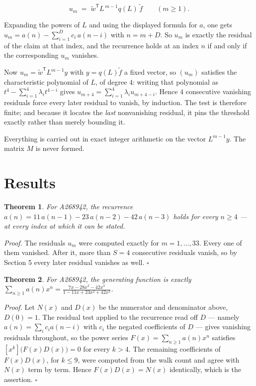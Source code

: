 \documentclass[11pt]{article}
\newtheorem{theorem}{Theorem}
\theoremstyle{definition}
\begin{document}
\[u_m \;=\; \tilde w^{\mathsf T} L^{\,m-1} q(L)\,\tilde f \qquad (m \ge 1).\]

Expanding the powers of $L$ and using the displayed formula for $a$, one gets $u_m = a(n) - \sum_{i=1}^{D} c_i\,a(n-i)$ with $n = m + D$. So $u_m$ is exactly the residual of the claim at that index, and the recurrence holds at an index $n$ if and only if the corresponding $u_m$ vanishes.

Now $u_m = \tilde w^{\mathsf T} L^{m-1} y$ with $y = q(L)\tilde f$ a fixed vector, so $(u_m)$ satisfies the characteristic polynomial of $L$, of degree $4$: writing that polynomial as $t^{4} - \sum_{i=1}^{4} \lambda_i t^{4-i}$ gives $u_{m+4} = \sum_{i=1}^{4} \lambda_i u_{m+4-i}$. Hence $4$ consecutive vanishing residuals force every later residual to vanish, by induction. The test is therefore finite; and because it locates the {\itshape last} nonvanishing residual, it pins the threshold exactly rather than merely bounding it.

Everything is carried out in exact integer arithmetic on the vector $L^{m-1}y$. The matrix $M$ is never formed.

\section{Results}

\begin{theorem} For A268942, the recurrence $a(n) = 11\,a(n-1) - 23\,a(n-2) - 42\,a(n-3)$ holds for every $n \ge 4$ --- at every index at which it can be stated.\end{theorem}

{\itshape Proof.} The residuals $u_m$ were computed exactly for $m = 1,\dots,33$. Every one of them vanished. After it, more than $S = 4$ consecutive residuals vanish, so by Section 5 every later residual vanishes as well. $\square$

\begin{theorem} For A268942, the generating function is exactly $\sum_{n\ge 1} a(n)x^n = \frac{7x - 28x^{2} - 42x^{3}}{1 - 11x + 23x^{2} + 42x^{3}}$.\end{theorem}

{\itshape Proof.} Let $N(x)$ and $D(x)$ be the numerator and denominator above, $D(0)=1$. The residual test applied to the recurrence read off $D$ --- namely $a(n) = \sum_i c_i a(n-i)$ with $c_i$ the negated coefficients of $D$ --- gives vanishing residuals throughout, so the power series $F(x)=\sum_{n\ge 1}a(n)x^n$ satisfies $[x^k]\bigl(F(x)D(x)\bigr) = 0$ for every $k > 4$. The remaining coefficients of $F(x)D(x)$, for $k \le 9$, were computed from the walk count and agree with $N(x)$ term by term. Hence $F(x)D(x) = N(x)$ identically, which is the assertion. $\square$
\end{document}
